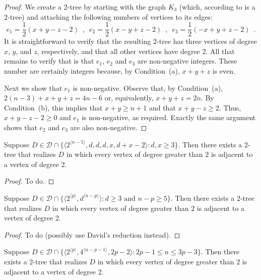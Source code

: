 \documentclass[lotsofwhite,charterfonts]{patmorin}
\newcommand{\rep}[1]{^{\langle#1\rangle}}
\newcommand{\degreesum}{Condition~(a)}
\newcommand{\maxdegree}{Condition~(b)}
\begin{document}
\begin{proof}
We create a 2-tree by starting with the graph $K_3$ (which, according
to  is a
2-tree) and attaching the following numbers of vertices to its edges:
\[
    e_1=\frac{1}{2}(x+y-z-2) \enspace , \enspace
    e_2=\frac{1}{2}(x-y+z-2) \enspace , \enspace 
    e_3=\frac{1}{2}(-x+y+z-2) \enspace .
\]
It is straightforward to verify that the resulting 2-tree has three
vertices of degree $x$, $y$, and $z$, respectively, and that all other
vertices have degree 2.  All that remains to verify that is that
$e_1$, $e_2$ and $e_3$ are non-negative integers.  These number are
certainly integers because, by \degreesum, $x+y+z$ is even.  

Next we show that $e_1$ is non-negative.  Observe that, by \degreesum,
$2(n-3)+x+y+z = 4n-6$ or, equivalently, $x+y+z=2n$.  By \maxdegree,
this implies that $x+y \ge n+1$ and that $x+y-z \ge 2$.  Thus,
$x+y-z-2 \ge 0$ and $e_1$ is non-negative, as required.  
Exactly the same argument shows that $e_2$ and $e_3$ are also
non-negative.
\end{proof}

\begin{lem}
Suppose $D\in \mathcal{D}\cap \{\langle 2\rep{n-5},d,d,d,x,d+x-2 \rangle:
\mbox{$d,x\ge 3$}\}$.
Then there exists a 2-tree that realizes $D$ in which every vertex of
degree greater than $2$ is adjacent to a vertex of degree 2.
\end{lem}

\begin{proof}
To do.
\end{proof}


\begin{lem}
Suppose $D\in \mathcal{D}\cap \{\langle 2\rep{p},d\rep{n-p}\rangle:
\mbox{$d\ge 3$ and $n-p \ge 5$}\}$.
Then there exists a 2-tree that realizes $D$ in which every vertex of
degree greater than $2$ is adjacent to a vertex of degree 2.
\end{lem}

\begin{proof}
To do (possibly use David's reduction instead).
\end{proof}


\begin{lem}
Suppose $D\in \mathcal{D}\cap \{\langle 2\rep{p},4\rep{n-p-1},2p-2\rangle:
2p-1\le n\le 3p-3\}$.
Then there exists a 2-tree that realizes $D$ in which every vertex of
degree greater than $2$ is adjacent to a vertex of degree 2.
\end{lem}
\end{document}

